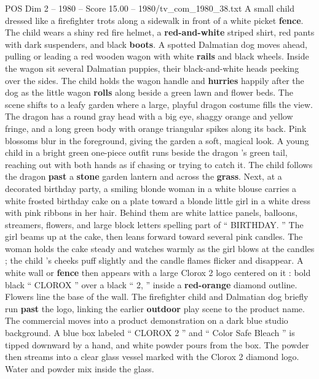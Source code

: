 \begin{textsample}{POS Dim 2 – 1980 – Score 15.00 – 1980/tv\_com\_1980\_38.txt}  \label{ex:f2_pos_065}
A small child dressed like a firefighter trots along a sidewalk in front of a white picket \textbf{fence}.
The child wears a shiny red fire helmet, a \textbf{red-and-white} striped shirt, red pants with dark suspenders, and black \textbf{boots}.
A spotted Dalmatian dog moves ahead, pulling or leading a red wooden wagon with white \textbf{rails} and black wheels.
Inside the wagon sit several Dalmatian puppies, their black-and-white heads peeking over the sides.
The child holds the wagon handle and \textbf{hurries} happily after the dog as the little wagon \textbf{rolls} along beside a green lawn and flower beds.
The scene shifts to a leafy garden where a large, playful dragon costume fills the view.
The dragon has a round gray head with a big eye, shaggy orange and yellow fringe, and a long green body with orange triangular spikes along its back.
Pink blossoms blur in the foreground, giving the garden a soft, magical look.
A young child in a bright green one-piece outfit runs beside the dragon ’s green tail, reaching out with both hands as if chasing or trying to catch it.
The child follows the dragon \textbf{past} a \textbf{stone} garden lantern and across the \textbf{grass}.
Next, at a decorated birthday party, a smiling blonde woman in a white blouse carries a white frosted birthday cake on a plate toward a blonde little girl in a white dress with pink ribbons in her hair.
Behind them are white lattice panels, balloons, streamers, flowers, and large block letters spelling part of “ BIRTHDAY. ” The girl beams up at the cake, then leans forward toward several pink candles.
The woman holds the cake steady and watches warmly as the girl blows at the candles ; the child ’s cheeks puff slightly and the candle flames flicker and disappear.
A white wall or \textbf{fence} then appears with a large Clorox 2 logo centered on it : bold black “ CLOROX ” over a black “ 2, ” inside a \textbf{red-orange} diamond outline.
Flowers line the base of the wall.
The firefighter child and Dalmatian dog briefly run \textbf{past} the logo, linking the earlier \textbf{outdoor} play scene to the product name.
The commercial moves into a product demonstration on a dark blue studio background.
A blue box labeled “ CLOROX 2 ” and “ Color Safe Bleach ” is tipped downward by a hand, and white powder pours from the box.
The powder then streams into a clear glass vessel marked with the Clorox 2 diamond logo.
Water and powder mix inside the glass.

\end{textsample}
